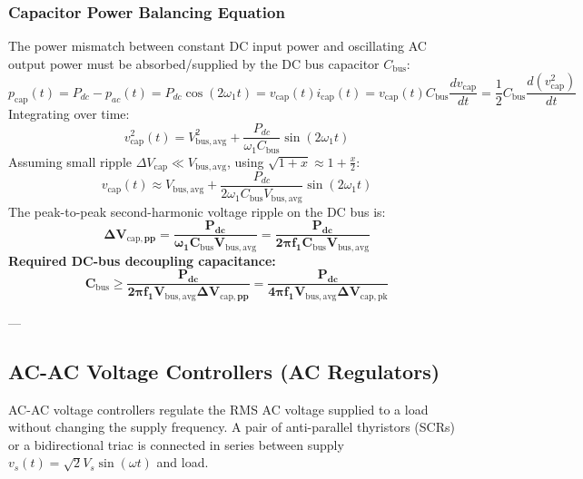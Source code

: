 \subsubsection{Capacitor Power Balancing Equation}
The power mismatch between constant DC input power and oscillating AC output power must be absorbed/supplied by the DC bus capacitor $C_{\mathrm{bus}}$:
\begin{equation}
p_{\mathrm{cap}}(t) = P_{dc} - p_{ac}(t) = P_{dc} \cos(2\omega_1 t) = v_{\mathrm{cap}}(t) i_{\mathrm{cap}}(t) = v_{\mathrm{cap}}(t) C_{\mathrm{bus}} \frac{dv_{\mathrm{cap}}}{dt} = \frac{1}{2} C_{\mathrm{bus}} \frac{d(v_{\mathrm{cap}}^2)}{dt}
\end{equation}
Integrating over time:
\begin{equation}
v_{\mathrm{cap}}^2(t) = V_{\mathrm{bus,avg}}^2 + \frac{P_{dc}}{\omega_1 C_{\mathrm{bus}}} \sin(2\omega_1 t)
\end{equation}
Assuming small ripple $\Delta V_{\mathrm{cap}} \ll V_{\mathrm{bus,avg}}$, using $\sqrt{1 + x} \approx 1 + \frac{x}{2}$:
\begin{equation}
v_{\mathrm{cap}}(t) \approx V_{\mathrm{bus,avg}} + \frac{P_{dc}}{2\omega_1 C_{\mathrm{bus}} V_{\mathrm{bus,avg}}} \sin(2\omega_1 t)
\end{equation}
The peak-to-peak second-harmonic voltage ripple on the DC bus is:
\begin{equation}
\label{eq:microinverter_ripple}
\mathbf{\Delta V_{\mathrm{cap},pp} = \frac{P_{dc}}{\omega_1 C_{\mathrm{bus}} V_{\mathrm{bus,avg}}} = \frac{P_{dc}}{2\pi f_1 C_{\mathrm{bus}} V_{\mathrm{bus,avg}}}}
\end{equation}
\textbf{Required DC-bus decoupling capacitance:}
\begin{equation}
\label{eq:cbus_sizing}
\mathbf{C_{\mathrm{bus}} \ge \frac{P_{dc}}{2\pi f_1 V_{\mathrm{bus,avg}} \Delta V_{\mathrm{cap},pp}} = \frac{P_{dc}}{4\pi f_1 V_{\mathrm{bus,avg}} \Delta V_{\mathrm{cap,pk}}}}
\end{equation}

---

\subsection{AC-AC Voltage Controllers (AC Regulators)}

AC-AC voltage controllers regulate the RMS AC voltage supplied to a load without changing the supply frequency. A pair of anti-parallel thyristors (SCRs) or a bidirectional triac is connected in series between supply $v_s(t) = \sqrt{2} V_s \sin(\omega t)$ and load.

